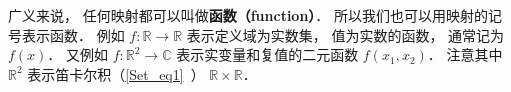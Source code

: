 

广义来说， 任何映射都可以叫做\textbf{函数（function）}． 所以我们也可以用映射的记号表示函数． 例如 $f: \mathbb R \to \mathbb R$ 表示定义域为实数集， 值为实数的函数， 通常记为 $f(x)$． 又例如 $f: \mathbb R^2 \to \mathbb C$ 表示实变量和复值的二元函数 $f(x_1, x_2)$． 注意其中 $\mathbb R^2$ 表示笛卡尔积（\autoref{Set_eq1}~） $\mathbb R \times \mathbb R$．
